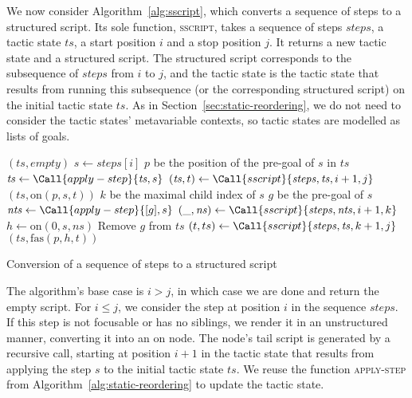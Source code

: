 \documentclass[sigplan,10pt,anonymous,review]{acmart}
\begin{document}
We now consider Algorithm~\ref{alg:sscript}, which converts a sequence of steps to a structured script.
Its sole function, \textsc{sscript}, takes a sequence of steps $\mathit{steps}$, a tactic state $\mathit{ts}$, a start position $i$ and a stop position $j$.
It returns a new tactic state and a structured script.
The structured script corresponds to the subsequence of $\mathit{steps}$ from $i$ to $j$, and the tactic state is the tactic state that results from running this subsequence (or the corresponding structured script) on the initial tactic state $\mathit{ts}$.
As in Section~\ref{sec:static-reordering}, we do not need to consider the tactic states' metavariable contexts, so tactic states are modelled as lists of goals.

\begin{algorithm}
  \begin{algorithmic}
        \State \Return $(\mathit{ts}, \mathit{empty})$
      \EndIf
      \State $s \gets \mathit{steps}[i]$
      \State \Let $p$ be the position of the pre-goal of $s$ in $\mathit{ts}$
        \State $\mathit{ts} \gets \Call{apply-step}{\mathit{ts}, s}$
        \State $(\mathit{ts}, t) \gets \Call{sscript}{\mathit{steps}, \mathit{ts}, i+1, j}$
        \State \Return $(\mathit{ts}, \mathrm{on}(p, s, t))$
      \Else
        \State \Let $k$ be the maximal child index of $s$
        \State \Let $g$ be the pre-goal of $s$
        \State $\mathit{nts} \gets \Call{apply-step}{[g], s}$
        \State $(\_, \mathit{ns}) \gets \Call{sscript}{\mathit{steps}, \mathit{nts}, i+1, k}$
        \State $h \gets \mathrm{on}(0, s, \mathit{ns})$
        \State Remove $g$ from $ts$
        \State $(t, ts) \gets \Call{sscript}{\mathit{steps}, \mathit{ts}, k+1, j}$
        \State \Return $(\mathit{ts}, \mathrm{fas}(p, h, t))$
      \EndIf
    \EndFunction
  \end{algorithmic}
  \caption{Conversion of a sequence of steps to a structured script}%
  \label{alg:sscript}
\end{algorithm}

The algorithm's base case is $i > j$, in which case we are done and return the empty script.
For $i ≤ j$, we consider the step at position $i$ in the sequence $\mathit{steps}$.
If this step is not focusable or has no siblings, we render it in an unstructured manner, converting it into an $\mathrm{on}$ node.
The node's tail script is generated by a recursive call, starting at position $i + 1$ in the tactic state that results from applying the step $s$ to the initial tactic state $\mathit{ts}$.
We reuse the function \textsc{apply-step} from Algorithm~\ref{alg:static-reordering} to update the tactic state.
\end{document}
